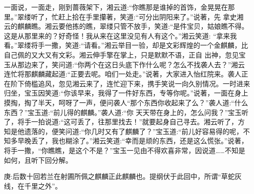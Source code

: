 \begin{parag}
    一面说，一面走，刚到蔷薇架下，湘云道:“你瞧那是谁掉的首饰，金晃晃在那里。”翠缕听了，忙赶上拾在手里攥著，笑道:“可分出阴阳来了。”说著，先 拿史湘云的麒麟瞧。湘云要他拣的瞧，翠缕只管不放手，笑道:“是件宝贝，姑娘瞧不得。这是从那里来的？好奇怪！我从来在这里没见有人有这个。”湘云笑道: “拿来我看。”翠缕将手一撒，笑道:“请看。”湘云举目一验，却是文彩辉煌的一个金麒麟，比自己佩的又大又有文彩。湘云伸手擎在掌上，只是默默不语，正自 出神，忽见宝玉从那边来了，笑问道:“你两个在这日头底下作什么呢？怎么不找袭人去？”湘云连忙将那麒麟藏起道:“正要去呢。咱们一处走。”说著，大家进入怡红院来。袭人正在阶下倚槛追风，忽见湘云来了，连忙迎下来，携手笑说一向久别情况。一时进来归坐，宝玉因笑道:“你该早来，我得了一件好东西，专等你呢。”说著，一面在身上摸掏，掏了半天，呵呀了一声，便问袭人“那个东西你收起来了么？”袭人道:“什么东西？”宝玉道:“前儿得的麒麟。”袭人道:“你 天天带在身上的，怎么问我？”宝玉听了，将手一拍说道:“这可丢了，往那里找去！”就要起身自己寻去。湘云听了，方知是他遗落的，便笑问道:“你几时又有了麒麟了？”宝玉道:“前儿好容易得的呢，不知多早晚丢了，我也糊涂了。”湘云笑道:“幸而是顽的东西，还是这么慌张。”说著，将手一撒，“你瞧瞧，是这个不是？”宝玉一见由不得欢喜非常，因说道……不知是如何，且听下回分解。
\end{parag}


\begin{parag}
    \begin{note}庚:后数十回若兰在射圃所佩之麒麟正此麒麟也。提纲伏于此回中，所谓“草蛇灰线，在千里之外”。\end{note}
\end{parag}

